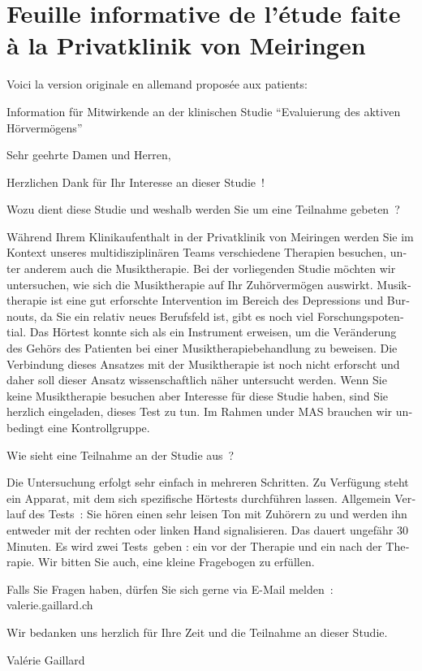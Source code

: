 \chapter{Feuille informative de l'étude faite à la Privatklinik von Meiringen}
Voici la version originale en allemand proposée aux patients:
\begin{german}

Information für Mitwirkende an der klinischen Studie
\foreignquote{german}{Evaluierung des aktiven Hörvermögens}


Sehr geehrte Damen und Herren,

Herzlichen Dank für Ihr Interesse an dieser Studie !

Wozu dient diese Studie und weshalb werden Sie um eine Teilnahme gebeten ?

Während Ihrem Klinikaufenthalt  in der Privatklinik von Meiringen werden Sie im Kontext 
unseres multidisziplinären Teams verschiedene Therapien besuchen, unter anderem auch die Musiktherapie. Bei der vorliegenden Studie möchten wir untersuchen, wie sich die Musiktherapie auf Ihr Zuhörvermögen auswirkt.
Musiktherapie ist eine gut erforschte Intervention im Bereich des Depressions und Burnouts, da Sie ein relativ neues Berufsfeld ist, gibt es noch viel Forschungspotential.
Das Hörtest konnte sich als ein Instrument erweisen, um die Veränderung des Gehörs des Patienten bei einer Musiktherapiebehandlung zu beweisen. Die Verbindung dieses Ansatzes mit der Musiktherapie ist noch nicht erforscht und daher soll dieser Ansatz wissenschaftlich näher untersucht werden.
Wenn Sie keine Musiktherapie besuchen aber Interesse für diese Studie haben, sind Sie herzlich eingeladen, dieses Test zu tun. Im Rahmen under MAS brauchen wir unbedingt eine Kontrollgruppe.

Wie sieht eine Teilnahme an der Studie aus ?

Die Untersuchung erfolgt sehr einfach in mehreren Schritten.
Zu Verfügung steht ein Apparat, mit dem sich spezifische Hörtests durchführen lassen.
Allgemein Verlauf des Tests :  
Sie hören einen sehr leisen Ton mit Zuhörern zu und werden ihn entweder mit der rechten  oder linken Hand  signalisieren. Das dauert ungefähr 30 Minuten.
Es wird zwei Tests geben : ein vor der Therapie und ein nach der Therapie.
Wir bitten Sie auch, eine kleine Fragebogen zu erfüllen.


Falls Sie Fragen haben, dürfen Sie sich gerne via E-Mail melden : valerie.gaillard\@gmx.ch

Wir bedanken uns herzlich für Ihre Zeit und die Teilnahme an dieser Studie.

\end{german}
Valérie Gaillard


